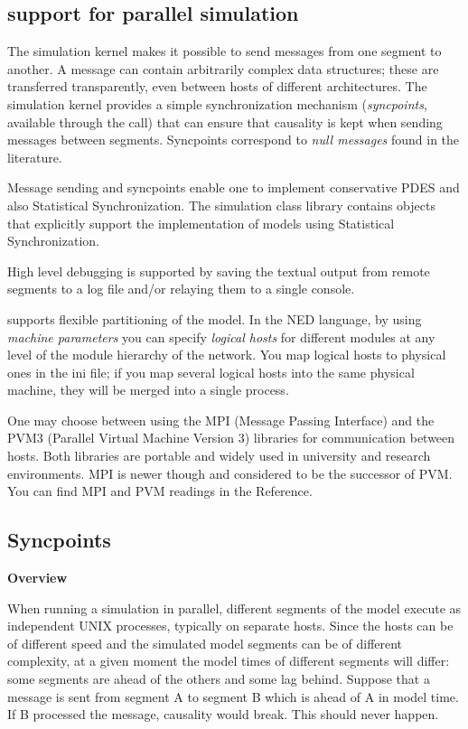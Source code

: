 \subsection{{\opp} support for parallel simulation}

The simulation kernel makes it possible to send messages from one
segment to another. A message can contain arbitrarily complex data
structures; these are transferred transparently, even between hosts of
different architectures. The simulation kernel provides a simple
synchronization mechanism (\textit{syncpoints}, available through the
 call) that can ensure that causality is kept when
sending messages between segments. Syncpoints correspond to
\textit{null messages} found in the literature.

Message sending and syncpoints enable one to implement conservative
PDES and also Statistical Synchronization. The simulation class
library contains objects that explicitly support the implementation
of models using Statistical Synchronization.


High level debugging is supported by saving the textual output
from remote segments to a log file and/or relaying them to a
single console.

{\opp} supports flexible partitioning of the
model. In the NED language, by using
\textit{machine parameters} you can specify \textit{logical
  hosts} for different modules at any level of
the module hierarchy of the network. You map logical hosts to physical
ones in the ini file; if you map several logical hosts into the same
physical machine, they will be merged into a single {\opp} process.


One may choose between using the MPI (Message Passing
Interface) and the PVM3 (Parallel Virtual Machine Version
3) libraries for communication between hosts. Both libraries are
portable and widely used in university and research environments. MPI
is newer though and considered to be the successor of PVM. You can
find MPI and PVM readings in the Reference.





\subsection{Syncpoints}

\textbf{Overview}


When running a simulation in parallel, different segments of
the model execute as independent UNIX processes, typically on
separate hosts. Since the hosts can be of different speed and
the simulated model segments can be of different complexity,
at a given moment the model times of different segments will
differ: some segments are ahead of the others and some lag behind.
Suppose that a message is sent from segment A to segment B which
is ahead of A in model time. If B processed the message, causality
would break. This should never happen.


